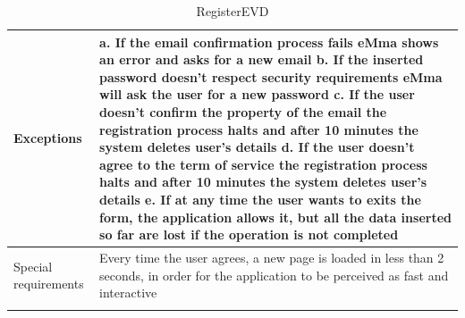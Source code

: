 \begin{center}
\begin{longtable}{p{4cm} p{11cm}}
     \hline
     Exceptions &  
        a. If the email confirmation process fails eMma shows an error and asks for a new email\newline
        b. If the inserted password doesn't respect security requirements eMma will ask the user for a new password \newline
        c. If the user doesn't confirm the property of the email the registration process halts and after 10 minutes the system deletes user's details \newline
        d. If the user doesn't agree to the term of service the registration process halts and after 10 minutes the system deletes user's details \newline
        e. If at any time the user wants to exits the form, the application allows it, but all the data inserted so far are lost if the operation is not completed \\
     \hline
     Special requirements &  Every time the user agrees, a new page is loaded in less than 2 seconds, in order for the application to be perceived as fast and interactive \\
     \hline
    \caption{RegisterEVD}
    \label{tab:RegisterEVD}
    \end{longtable}
\end{center}

